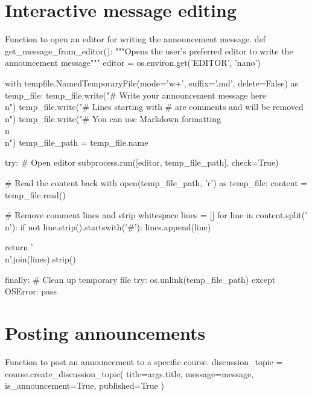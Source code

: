 \section{Interactive message editing}

Function to open an editor for writing the announcement message.
\nwenddocs{}\plusendmoddef\nwstartdeflinemarkup{}\nwenddeflinemarkup
def get_message_from_editor():
  """Opens the user's preferred editor to write the announcement message"""
  editor = os.environ.get('EDITOR', 'nano')
  
  with tempfile.NamedTemporaryFile(mode='w+', suffix='.md', delete=False) as temp_file:
    temp_file.write("# Write your announcement message here\\n")
    temp_file.write("# Lines starting with # are comments and will be removed\\n")
    temp_file.write("# You can use Markdown formatting\\n\\n")
    temp_file_path = temp_file.name
  
  try:
    # Open editor
    subprocess.run([editor, temp_file_path], check=True)
    
    # Read the content back
    with open(temp_file_path, 'r') as temp_file:
      content = temp_file.read()
    
    # Remove comment lines and strip whitespace
    lines = []
    for line in content.split('\\n'):
      if not line.strip().startswith('#'):
        lines.append(line)
    
    return '\\n'.join(lines).strip()
    
  finally:
    # Clean up temporary file
    try:
      os.unlink(temp_file_path)
    except OSError:
      pass
\nwendcode{}\nwdocspar


\section{Posting announcements}

Function to post an announcement to a specific course.
\nwenddocs{}\endmoddef\nwstartdeflinemarkup{}\nwenddeflinemarkup
discussion_topic = course.create_discussion_topic(
  title=args.title,
  message=message,
  is_announcement=True,
  published=True
)
\nwendcode{}

